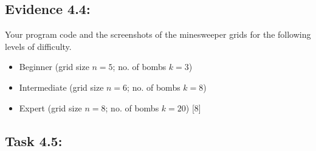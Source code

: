\subsection*{Evidence 4.4: }

Your program code and the screenshots of the minesweeper grids for
the following levels of difficulty. 
\begin{itemize}
\item Beginner (grid size $n=5$; no. of bombs $k=3$)
\item Intermediate (grid size $n=6$; no. of bombs $k=8$)
\item Expert (grid size $n=8$; no. of bombs $k=20$) {[}8{]}
\end{itemize}

\subsection*{Task 4.5: }

